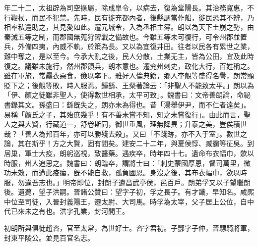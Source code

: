 \begin{pinyinscope}
年二十二，太祖辟為司空掾屬，除成臯令，以病去，復為堂陽長。其治務寬惠，不行鞭杖，而民不犯禁。先時，民有徙充都內者，後縣調當作船，徙民恐其不辨，乃相率私還助之，其見愛如此。遷元城令，入為丞相主簿。朗以為天下土崩之勢，由秦滅五等之制，而郡國無蒐狩習戰之備故也。今雖五等未可復行，可令州郡並置兵，外備四夷，內威不軌，於策為長。又以為宜復井田。往者以民各有累世之業，難中奪之，是以至今。今承大亂之後，民人分散，土業无主，皆為公田，宜及此時復之。議雖未施行，然州郡領兵，朗本意也。遷兖州刺史，政化大行，百姓稱之。雖在軍旅，常麤衣惡食，儉以率下。雅好人倫典籍，鄉人李覿等盛得名譽，朗常顯貶下之；後覿等敗，時人服焉。鍾繇、王粲著論云：「非聖人不能致太平。」朗以為「伊、顏之徒雖非聖人，使得數世相承，太平可致」。魏書曰：文帝善朗論，命祕書錄其文。孫盛曰：繇旣失之，朗亦未為得也。昔「湯舉伊尹，而不仁者遠矣」。易稱「顏氏之子，其殆庶幾乎！有不善未嘗不知，知之未嘗復行」。由此而言，聖人之與大賢，行藏道一，舒卷斯同，御世垂風，理無降異；升泰之美，豈俟積世哉？「善人為邦百年，亦可以勝殘去殺」。又曰「不踐跡，亦不入于室」。數世之論，其在斯乎！方之大賢，固有間矣。建安二十二年，與夏侯惇、臧霸等征吳。到居巢，軍士大疫，朗躬巡視，致醫藥。遇疾卒，時年四十七。遺命布衣幅巾，歛以時服，州人追思之。魏書曰：朗臨卒，謂將士曰：「刺史蒙國厚恩，督司萬里，微功未效，而遭此疫癘，旣不能自救，孤負國恩。身沒之後，其布衣幅巾，歛以時服，勿違吾志也。」明帝即位，封朗子遺昌武亭侯，邑百戶。朗弟孚又以子望繼朗後。遺薨，望子洪嗣。晉諸公贊曰：望字子初，孚之長子。有才識，早知名。咸熈中位至司徒，入晉封義陽王，遷太尉、大司馬。時孚為太宰，父子居上公位，自中代已來未之有也。洪字孔業，封河間王。

初朗所與俱徙趙咨，官至太常，為世好士。咨字君初。子酆字子仲，晉驃騎將軍，封東平陵公。並見百官名志。


\end{pinyinscope}